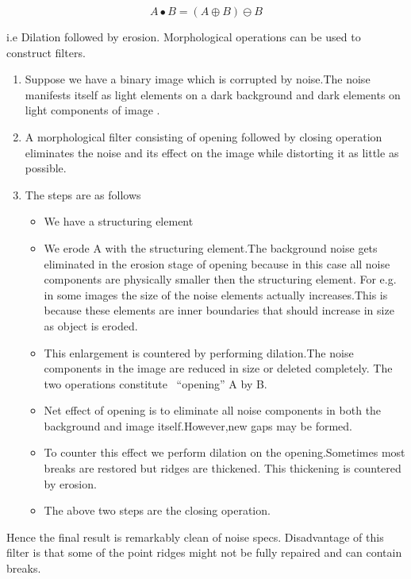 \[A\bullet B=(A\oplus B)\ominus B\]

 i.e Dilation followed by erosion.
 Morphological operations can be used to construct filters.

\begin{enumerate}
	\item Suppose we have a binary image which is corrupted by noise.The noise manifests itself as light elements on a dark background and dark elements on  light components of image .
	\item A morphological filter consisting of opening followed by closing operation eliminates the noise and its effect on the image while distorting it as little as possible.
	\item The steps are as follows

\begin{itemize}
	\item We have a structuring element
	\item We erode A with the structuring element.The background noise gets eliminated in the erosion stage of opening because in this case all noise components are physically smaller then the structuring element.
For e.g. in some images the size of the noise elements actually increases.This is because these elements are inner boundaries that should increase in size as object is eroded.
\item This enlargement is countered by performing dilation.The noise components in the image are reduced in size or deleted completely.
The two operations constitute ~``opening'' A by B.
\item Net effect of opening is to eliminate all noise components in both the background and image itself.However,new gaps may be formed.
\item To counter this effect we perform dilation on the opening.Sometimes most breaks are restored but ridges are thickened.
This thickening is countered by erosion.
\item The above two steps are the closing operation.
\end{itemize}

\end{enumerate}
Hence the final result is remarkably clean of noise specs.
 Disadvantage of this filter is that some of the point ridges might not be fully repaired and can contain breaks. \\


